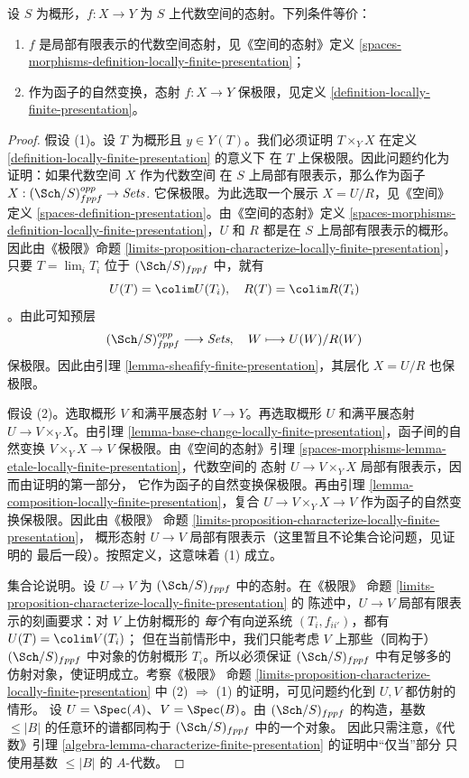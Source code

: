 \begin{proposition}
\label{proposition-characterize-locally-finite-presentation}
设 $S$ 为概形，$f:X\to Y$ 为 $S$ 上代数空间的态射。下列条件等价：
\begin{enumerate}
\item $f$ 是局部有限表示的代数空间态射，见《空间的态射》定义
\ref{spaces-morphisms-definition-locally-finite-presentation}；
\item 作为函子的自然变换，态射 $f:X\to Y$ 保极限，见定义
\ref{definition-locally-finite-presentation}。
\end{enumerate}
\end{proposition}

\begin{proof}
假设 (1)。设 $T$ 为概形且 $y\in Y(T)$。我们必须证明
$T\times_YX$ 在定义 \ref{definition-locally-finite-presentation} 的意义下
在 $T$ 上保极限。因此问题约化为证明：如果代数空间 $X$ 作为代数空间
在 $S$ 上局部有限表示，那么作为函子
$X : (\Sch/S)_{fppf}^{opp} \to \textit{Sets}$.
它保极限。为此选取一个展示 $X=U/R$，见《空间》定义
\ref{spaces-definition-presentation}。由《空间的态射》定义
\ref{spaces-morphisms-definition-locally-finite-presentation}，$U$ 和 $R$
都是在 $S$ 上局部有限表示的概形。因此由《极限》命题
\ref{limits-proposition-characterize-locally-finite-presentation}，只要
$T=\lim_iT_i$ 位于 $(\Sch/S)_{fppf}$ 中，就有
$$
U(T) = \colim U(T_i), \quad
R(T) = \colim R(T_i)
$$
。由此可知预层
$$
(\Sch/S)_{fppf}^{opp} \longrightarrow \textit{Sets}, \quad
W \longmapsto U(W)/R(W)
$$
保极限。因此由引理 \ref{lemma-sheafify-finite-presentation}，其层化
$X=U/R$ 也保极限。

\medskip\noindent
假设 (2)。选取概形 $V$ 和满平展态射 $V\to Y$。再选取概形 $U$
和满平展态射 $U\to V\times_YX$。由引理
\ref{lemma-base-change-locally-finite-presentation}，函子间的自然变换
$V\times_YX\to V$ 保极限。由《空间的态射》引理
\ref{spaces-morphisms-lemma-etale-locally-finite-presentation}，代数空间的
态射 $U\to V\times_YX$ 局部有限表示，因而由证明的第一部分，
它作为函子的自然变换保极限。再由引理
\ref{lemma-composition-locally-finite-presentation}，复合
$U\to V\times_YX\to V$ 作为函子的自然变换保极限。因此由《极限》
命题 \ref{limits-proposition-characterize-locally-finite-presentation}，
概形态射 $U\to V$ 局部有限表示（这里暂且不论集合论问题，见证明的
最后一段）。按照定义，这意味着 (1) 成立。

\medskip\noindent
集合论说明。设 $U\to V$ 为 $(\Sch/S)_{fppf}$ 中的态射。在《极限》
命题 \ref{limits-proposition-characterize-locally-finite-presentation} 的
陈述中，$U\to V$ 局部有限表示的刻画要求：对 $V$ 上仿射概形的
{\it 每个}有向逆系统 $(T_i,f_{ii'})$，都有
$U(T)=\colim V(T_i)$；%
但在当前情形中，我们只能考虑 $V$ 上那些（同构于）
$(\Sch/S)_{fppf}$ 中对象的仿射概形 $T_i$。所以必须保证
$(\Sch/S)_{fppf}$ 中有足够多的仿射对象，使证明成立。考察《极限》
命题 \ref{limits-proposition-characterize-locally-finite-presentation} 中
(2) $\Rightarrow$ (1) 的证明，可见问题约化到 $U,V$ 都仿射的情形。
设 $U=\Spec(A)$、$V=\Spec(B)$。由 $(\Sch/S)_{fppf}$ 的构造，基数
$\leq|B|$ 的任意环的谱都同构于 $(\Sch/S)_{fppf}$ 中的一个对象。
因此只需注意，《代数》引理
\ref{algebra-lemma-characterize-finite-presentation} 的证明中“仅当”部分
只使用基数 $\leq|B|$ 的 $A$-代数。
\end{proof}

